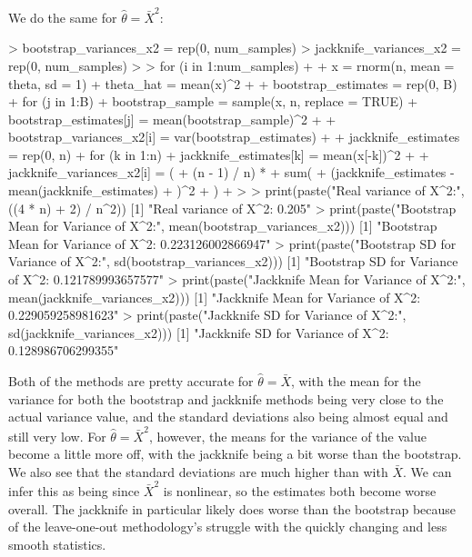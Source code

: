 \documentclass{article}
\begin{document}
{We do the same for \(\hat{\theta} = \bar{X}^2\):
\begin{spverbatim}
> bootstrap_variances_x2 = rep(0, num_samples)
> jackknife_variances_x2 = rep(0, num_samples)
> 
> for (i in 1:num_samples) {
+   
+   x = rnorm(n, mean = theta, sd = 1)
+   theta_hat = mean(x)^2
+   
+   bootstrap_estimates = rep(0, B)
+   for (j in 1:B) {
+     bootstrap_sample = sample(x, n, replace = TRUE)
+     bootstrap_estimates[j] = mean(bootstrap_sample)^2
+   }
+   bootstrap_variances_x2[i] = var(bootstrap_estimates)
+   
+   jackknife_estimates = rep(0, n)
+   for (k in 1:n) {
+     jackknife_estimates[k] = mean(x[-k])^2
+   }
+   jackknife_variances_x2[i] = (
+     (n - 1) / n) * 
+     sum(
+       (jackknife_estimates - mean(jackknife_estimates)
+       )^2
+     )
+ }
>   
> print(paste("Real variance of X^2:", ((4 * n) + 2) / n^2))
[1] "Real variance of X^2: 0.205"
> print(paste("Bootstrap Mean for Variance of X^2:", mean(bootstrap_variances_x2)))
[1] "Bootstrap Mean for Variance of X^2: 0.223126002866947"
> print(paste("Bootstrap SD for Variance of X^2:", sd(bootstrap_variances_x2)))
[1] "Bootstrap SD for Variance of X^2: 0.121789993657577"
> print(paste("Jackknife Mean for Variance of X^2:", mean(jackknife_variances_x2)))
[1] "Jackknife Mean for Variance of X^2: 0.229059258981623"
> print(paste("Jackknife SD for Variance of X^2:", sd(jackknife_variances_x2)))
[1] "Jackknife SD for Variance of X^2: 0.128986706299355"\end{spverbatim}

Both of the methods are pretty accurate for \(\hat{\theta} = \bar{X}\), with the mean for the variance for both the bootstrap and jackknife methods being very close to the actual variance value, and the standard deviations also being almost equal and still very low. For \(\hat{\theta} = \bar{X}^2\), however, the means for the variance of the value become a little more off, with the jackknife being a bit worse than the bootstrap. We also see that the standard deviations are much higher than with \(\bar{X}\). We can infer this as being since \(\bar{X}^2\) is nonlinear, so the estimates both become worse overall. The jackknife in particular likely does worse than the bootstrap because of the leave-one-out methodology's struggle with the quickly changing and less smooth statistics.

}
\end{document}
